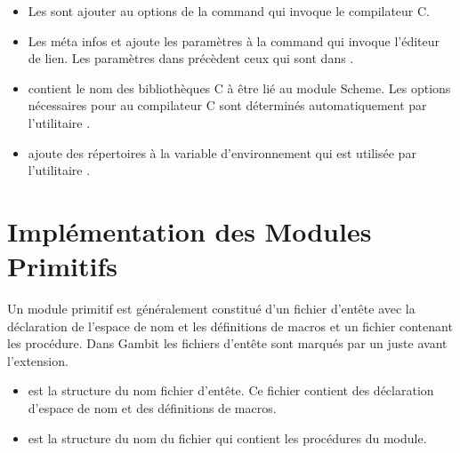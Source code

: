 \begin{itemize}
  \item Les  sont ajouter au options de la command qui
    invoque le compilateur C.

  \item Les méta infos  et 
    ajoute les paramètres à la command qui invoque l'éditeur de lien.
    Les paramètres dans  précèdent ceux
    qui sont dans .

  \item {} contient le nom des bibliothèques C à être
    lié au module Scheme. Les options nécessaires pour au compilateur
    C sont déterminés automatiquement par l'utilitaire .

  \item {} ajoute des répertoires à la variable d'environnement
     qui est utilisée par l'utilitaire .

\end{itemize}

\section{Implémentation des Modules Primitifs}

Un module primitif est généralement constitué d'un fichier d'entête avec la
déclaration de l'espace de nom et les définitions de macros et un fichier
contenant les procédure. Dans Gambit les fichiers d'entête sont marqués par un
\lstcode{#} juste avant l'extension.

\begin{itemize}

  \item {} est la structure du nom fichier d'entête.
    Ce fichier contient des déclaration d'espace de nom et des
    définitions de macros.

  \item {} est la structure du nom du fichier qui contient
    les procédures du module.

\end{itemize}

